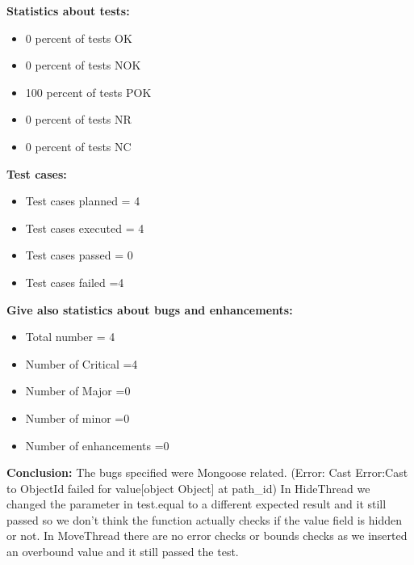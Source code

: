 \begin{flushleft}
\begin{flushleft}
\textbf{Statistics about tests:}
\begin{itemize}
  \item 	0 percent of tests OK
  \item  0 percent of tests NOK
   \item 100 percent of tests POK
    \item 	0 percent of tests NR
        \item 	0 percent of tests NC
 \end{itemize}

\textbf{Test cases:}
\begin{itemize}
  \item Test cases planned = 4 
  \item  Test cases executed = 4
   \item Test cases passed = 0
    \item Test cases failed =4
 \end{itemize}

\textbf{Give also statistics about bugs and enhancements:}
\begin{itemize}
  \item 	Total number = 4
  \item  	Number of Critical =4
   \item 	Number of Major =0
    \item Number of minor =0
      \item Number of enhancements =0
 \end{itemize}

\textbf{Conclusion:}
The bugs specified were Mongoose related. (Error: Cast Error:Cast to ObjectId failed for value[object Object] at path_id)
In HideThread we changed the parameter in test.equal to a different expected result and it still passed so we don’t think the function actually checks if the value field is hidden or not.
In MoveThread there are no error checks or bounds checks as we inserted an overbound value and it still passed the test.


\end{flushleft}


\end{flushleft}
